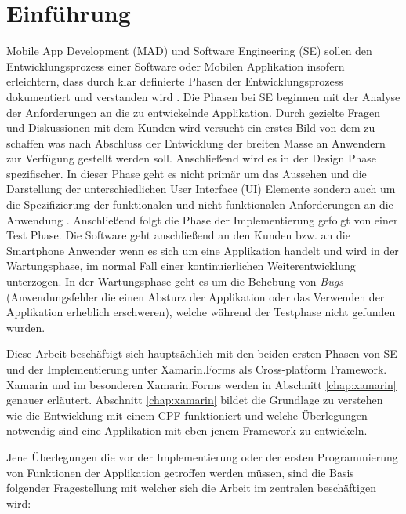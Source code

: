 %
%
% 
% 

\chapter{Einführung}
\label{chap:intro}
	Mobile App Development (MAD) und Software Engineering (SE) sollen den Entwicklungsprozess einer Software oder Mobilen Applikation insofern erleichtern, dass durch klar definierte Phasen der Entwicklungsprozess dokumentiert und verstanden wird \cite{Anthony2010}. Die Phasen bei SE beginnen mit der Analyse der Anforderungen an die zu entwickelnde Applikation. Durch gezielte Fragen und Diskussionen mit dem Kunden wird versucht ein erstes Bild von dem zu schaffen was nach Abschluss der Entwicklung der breiten Masse an Anwendern zur Verfügung gestellt werden soll. Anschließend wird es in der Design Phase spezifischer. In dieser Phase geht es nicht primär um das Aussehen und die Darstellung der unterschiedlichen User Interface (UI) Elemente sondern auch um die Spezifizierung der funktionalen und nicht funktionalen Anforderungen an die Anwendung \cite{Anthony2010}. Anschließend folgt die Phase der Implementierung gefolgt von einer Test Phase. Die Software geht anschließend an den Kunden bzw. an die Smartphone Anwender wenn es sich um eine Applikation handelt und wird in der Wartungsphase, im normal Fall einer kontinuierlichen Weiterentwicklung unterzogen. In der Wartungsphase geht es um die Behebung von \textit{Bugs} (Anwendungsfehler die einen Absturz der Applikation oder das Verwenden der Applikation erheblich erschweren), welche während der Testphase nicht gefunden wurden. 

	Diese Arbeit beschäftigt sich hauptsächlich mit den beiden ersten Phasen von SE und der Implementierung unter Xamarin.Forms als Cross-platform Framework. Xamarin und im besonderen Xamarin.Forms werden in Abschnitt \ref{chap:xamarin} genauer erläutert. Abschnitt \ref{chap:xamarin} bildet die Grundlage zu verstehen wie die Entwicklung mit einem CPF funktioniert und welche Überlegungen notwendig sind eine Applikation mit eben jenem Framework zu entwickeln.

	Jene Überlegungen die vor der Implementierung oder der ersten Programmierung von Funktionen der Applikation getroffen werden müssen, sind die Basis folgender Fragestellung mit welcher sich die Arbeit im zentralen beschäftigen wird:\vspace{1cm}

